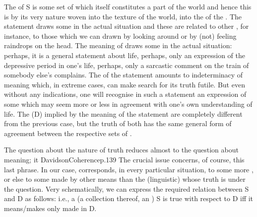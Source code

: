 The  of S is some set of  which itself constitutes
a part of the world and hence this  is by its very nature woven into
the texture of the world, into the  of the .
The statement  draws some  in the actual
situation and these are related to other , for instance, to
those which we can drawn by looking around or by (not) feeling raindrops on the
head.  The meaning of  draws some 
in the actual situation: perhaps, it is a general statement about life, perhaps,
only an expression of the depressive period in one's life, perhaps, only a
sarcastic comment on the train of somebody else's complains. The 
of the statement amounts to indeterminacy of meaning which, in extreme cases,
can make search for its truth futile. But even without any 
indications, one will recognise in such a statement an expression of some
 which may seem more or less in agreement with one's own
understanding of life. The  (D) implied by the meaning of the
statement are completely different from the previous case, but the truth of both
has the same general form of agreement between the respective sets of
.

\pa\label{pa:truth}
The question about the nature of truth reduces almost to the question about
meaning; it \citet{depends on just two things: what the words as spoken mean,
  and how the world is arranged.}{DavidsonCoherence}{p.139} The crucial issue
concerns, of course, this last phrase. In our case,  corresponds, in every particular situation, to some more
, or else to some  made by other means than
the (linguistic)  whose truth is under the question. Very
schematically, we can express the required relation between S and D as follows:
%
%
i.e., a  (a collection thereof, an ) S is true with
respect to D iff it means/makes only  made in D.

